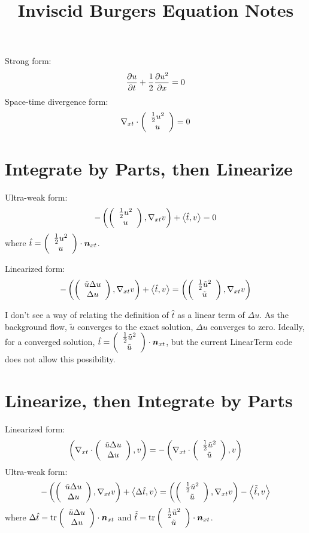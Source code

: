 \documentclass{article}
\title{Inviscid Burgers Equation Notes}
\date{}
\begin{document}
\maketitle
Strong form:
\[
\pd{u}{t}+\frac{1}{2}\pd{u^2}{x}=0
\]
Space-time divergence form:
\[
\Divxt{\vecttwo{\frac{1}{2}u^2}{u}}=0
\]
\section*{Integrate by Parts, then Linearize}
Ultra-weak form:
\[
-\LRp{\vecttwo{\frac{1}{2}u^2}{u},\Gradxt v}+\LRa{\hat t,v}=0
\]
where $\hat t=\vecttwo{\frac{1}{2}u^2}{u}\cdot\bfn_{xt}$.

Linearized form:
\[
-\LRp{\vecttwo{\tilde u\Delta u}{\Delta u},\Gradxt v}+\LRa{\hat t,v}=\LRp{\vecttwo{\frac{1}{2}\tilde u^2}{\tilde u},\Gradxt v}
\]

I don't see a way of relating the definition of $\hat t$ as a linear term of $\Delta u$. 
As the background flow, $\tilde u$ converges to the exact solution, $\Delta u$ converges to zero. 
Ideally, for a converged solution, $\hat t=\vecttwo{\frac{1}{2}\tilde u^2}{\tilde u}\cdot\bfn_{xt}$,
but the current LinearTerm code does not allow this possibility.

\section*{Linearize, then Integrate by Parts}
Linearized form:
\[
\LRp{\Divxt\vecttwo{\tilde u\Delta u}{\Delta u},v}=-\LRp{\Divxt\vecttwo{\frac{1}{2}\tilde u^2}{\tilde u},v}
\]
Ultra-weak form:
\[
-\LRp{\vecttwo{\tilde u\Delta u}{\Delta u},\Gradxt v}+\LRa{\Delta\hat t,v}=\LRp{\vecttwo{\frac{1}{2}\tilde u^2}{\tilde u},\Gradxt v}-\LRa{\tilde{\hat t},v}
\]
where $\Delta\hat t=\trace\vecttwo{\tilde u\Delta u}{\Delta u}\cdot\bfn_{xt}$
and $\tilde{\hat t}=\trace\vecttwo{\frac{1}{2}\tilde u^2}{\tilde u}\cdot\bfn_{xt}$.
\end{document}
